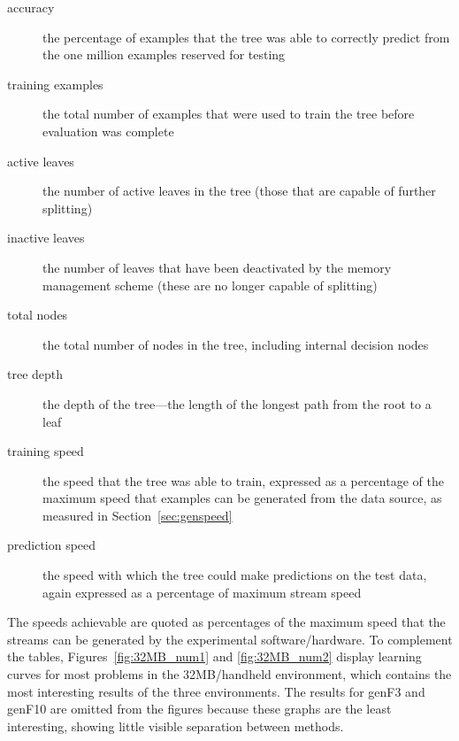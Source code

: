 \begin{description}
\item[accuracy] the percentage of examples that the tree was able to correctly predict from the one million examples reserved for testing
\item[training examples] the total number of examples that were used to train the tree before evaluation was complete
\item[active leaves] the number of active leaves in the tree (those that are capable of further splitting)
\item[inactive leaves] the number of leaves that have been deactivated by the memory management scheme (these are no longer capable of splitting)
\item[total nodes] the total number of nodes in the tree, including internal decision nodes
\item[tree depth] the depth of the tree---the length of the longest path from the root to a leaf
\item[training speed] the speed that the tree was able to train, expressed as a percentage of the maximum speed that examples can be generated from the data source, as measured in Section~\ref{sec:genspeed}
\item[prediction speed] the speed with which the tree could make predictions on the test data, again expressed as a percentage of maximum stream speed
\end{description}

The speeds achievable are quoted as percentages of the maximum speed that the streams can be generated by the experimental software/hardware. To complement the tables, Figures~\ref{fig:32MB_num1} and \ref{fig:32MB_num2} display learning curves for most problems in the 32MB/handheld environment, which contains the most interesting results of the three environments. The results for {\sc genF3} and {\sc genF10} are omitted from the figures because these graphs are the least interesting, showing little visible separation between methods.


